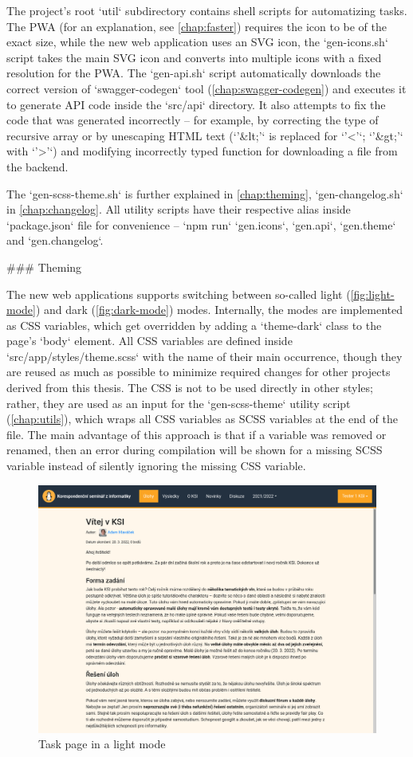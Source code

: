 \documentclass[
  digital, %
  oneside, %
  lof,     %
  nolot,     %
]{fithesis4}
\begin{document}
{The project's root `util` subdirectory contains shell scripts for automatizing tasks. The PWA (for an explanation, see \autoref{chap:faster}) requires the icon to be of the exact size, while the new web application uses an SVG icon, the `gen-icons.sh` script takes the main SVG icon and converts into multiple icons with a fixed resolution for the PWA. The `gen-api.sh` script automatically downloads the correct version of `swagger-codegen` tool (\autoref{chap:swagger-codegen}) and executes it to generate API code inside the `src/api` directory. It also attempts to fix the code that was generated incorrectly -- for example, by correcting the type of recursive array or by unescaping HTML text (`'&lt;'` is replaced for `'<'`; `'&gt;'` with `'>'`) and modifying incorrectly typed function for downloading a file from the backend.

The `gen-scss-theme.sh` is further explained in \autoref{chap:theming}, `gen-changelog.sh` in \autoref{chap:changelog}. All utility scripts have their respective alias inside `package.json` file for convenience -- `npm run` `gen.icons`, `gen.api`, `gen.theme` and `gen.changelog`. 

### Theming
\label{chap:theming}

The new web applications supports switching between so-called light (\autoref{fig:light-mode}) and dark (\autoref{fig:dark-mode}) modes. Internally, the modes are implemented as CSS variables, which get overridden by adding a `theme-dark` class to the page's `body` element. All CSS variables are defined inside `src/app/styles/theme.scss` with the name of their main occurrence, though they are reused as much as possible to minimize required changes for other projects derived from this thesis. The CSS is not to be used directly in other styles; rather, they are used as an input for the `gen-scss-theme` utility script (\autoref{chap:utils}), which wraps all CSS variables as SCSS variables at the end of the file. The main advantage of this approach is that if a variable was removed or renamed, then an error during compilation will be shown for a missing SCSS variable instead of silently ignoring the missing CSS variable.

\begin{figure}
\includegraphics[width=.8\textwidth]{assets/img/light-mode}
\caption{Task page in a light mode}
\label{fig:light-mode}
\end{figure}

}
\end{document}
